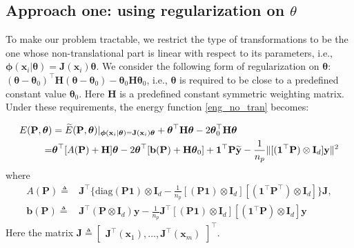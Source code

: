 \documentclass[11pt,bezier,]{article}
\begin{document}
\subsection{Approach  one: using  regularization on $\theta$  \label{subsec:scheme1}}




To make our problem tractable,
we restrict the type of transformations to be the one
whose non-translational part is linear with respect to its parameters,
i.e.,  $\boldsymbol\phi(\mathbf x_i|\boldsymbol\theta)=\mathbf J(\mathbf x_i) \boldsymbol\theta$. %
We consider the following form of regularization on $\boldsymbol\theta$:
$(\boldsymbol\theta-\boldsymbol\theta_0)^\top\mathbf H(\boldsymbol\theta-\boldsymbol\theta_0) - \boldsymbol\theta_0\mathbf H\boldsymbol\theta_0 $,
i.e., 
${\boldsymbol\theta}$ is required to be close to a predefined constant value  ${\boldsymbol\theta}_0$. 
Here $\mathbf H$ is a predefined constant symmetric weighting matrix. %
Under these requirements,
the energy function \eqref{eng_no_tran} becomes:

\begin{align}
 E(\mathbf P,{\boldsymbol\theta}) &
=\widetilde E (\mathbf P,{\boldsymbol\theta})|_{\boldsymbol\phi(\mathbf x_i|\boldsymbol\theta)=\mathbf J(\mathbf x_i) \boldsymbol\theta}
+ \boldsymbol\theta^\top \mathbf H\boldsymbol\theta -2 \boldsymbol\theta_0^\top\mathbf H\boldsymbol\theta \notag\\
= &{\boldsymbol\theta}^\top [A(\mathbf P)+\mathbf H] {\boldsymbol\theta} 
-2 {\boldsymbol\theta}^\top [\mathbf b(\mathbf P) + \mathbf H\boldsymbol\theta_0]
 + {\mathbf 1}^\top\mathbf P \mathbf{\widetilde y} %
 -\frac{1}{n_p} 
 \|[({\mathbf 1}^\top\mathbf P) \otimes \mathbf I_d]\mathbf y \|^2 \label{eng_reg}
\end{align}
where
\begin{align*}
A(\mathbf P)\triangleq & 
 \mathbf J^\top \{ \text{diag}(\mathbf P\mathbf 1)\otimes \mathbf I_d %
 -\frac{1}{n_p}  [(\mathbf P\mathbf 1)\otimes \mathbf I_d][(\mathbf 1^\top \mathbf P^\top)\otimes \mathbf I_d] \}\mathbf J,   \\
\mathbf b(\mathbf P)  \triangleq & \mathbf J^\top (\mathbf P\otimes \mathbf I_d) \mathbf y
-\frac{1}{n_p} \mathbf J^\top [(\mathbf P\mathbf 1)\otimes \mathbf I_d][(\mathbf 1^\top \mathbf P)\otimes \mathbf I_d] \mathbf y   
\end{align*}
Here the matrix  
$\mathbf J\triangleq\begin{bmatrix}
   \mathbf J^\top(\mathbf x_1), \dots, \mathbf J^\top(\mathbf x_m)
  \end{bmatrix}^\top$.
  
\end{document}
